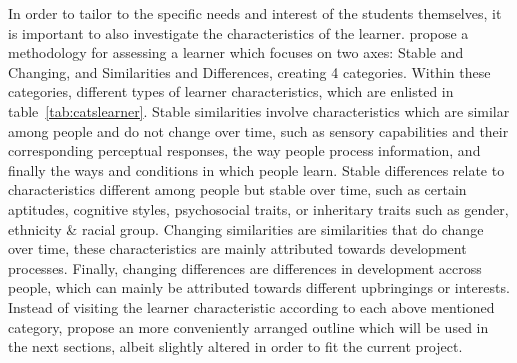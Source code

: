 In order to tailor to the specific needs and interest of the students themselves, it is important to also investigate the characteristics of the learner.  propose a methodology for assessing a learner which focuses on two axes: Stable and Changing, and Similarities and Differences, creating 4 categories. Within these categories, different types of learner characteristics, which are enlisted in table~\ref{tab:catslearner}. Stable similarities involve characteristics which are similar among people and do not change over time, such as sensory capabilities and their corresponding perceptual responses, the way people process information, and finally the ways and conditions in which people learn. Stable differences relate to characteristics different among people but stable over time, such as certain aptitudes, cognitive styles, psychosocial traits, or inheritary traits such as gender, ethnicity \& racial group. Changing similarities are similarities that do change over time, these characteristics are mainly attributed towards development processes. Finally, changing differences are differences in development accross people, which can mainly be attributed towards different upbringings or interests. Instead of visiting the learner characteristic according to each above mentioned category,  propose an more conveniently arranged outline which will be used in the next sections, albeit slightly altered in order to fit the current project.

